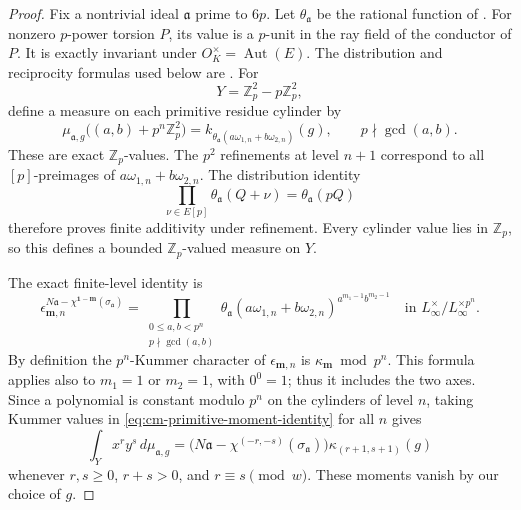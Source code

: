 \begin{proof}
Fix a nontrivial ideal \(\mathfrak a\) prime to \(6p\).
Let \(\theta_{\mathfrak a}\) be the rational function of
\cite[Definition 2.1, p.~7]{IshiiSoule}.
For nonzero \(p\)-power torsion \(P\), its value is a \(p\)-unit
in the ray field of the conductor of \(P\).
It is exactly invariant under \(O_K^\times=\operatorname{Aut}(E)\).
The distribution and reciprocity formulas used below are
\cite[Propositions 2.1--2.2, p.~7]{IshiiSoule}.
For
\[
             Y=\mathbb Z_p^2-p\mathbb Z_p^2,
\]
define a measure on each primitive residue cylinder by
\begin{equation}\label{eq:cm-cylinder-kummer}
 \mu_{\mathfrak a,g}\bigl((a,b)+p^n\mathbb Z_p^2\bigr)
   =k_{\theta_{\mathfrak a}(a\omega_{1,n}+b\omega_{2,n})}(g),
 \qquad p\nmid\gcd(a,b).
\end{equation}
These are exact \(\mathbb Z_p\)-values.
The \(p^2\) refinements at level \(n+1\) correspond to all
\([p]\)-preimages of \(a\omega_{1,n}+b\omega_{2,n}\).
The distribution identity
\[
  \prod_{\nu\in E[p]}\theta_{\mathfrak a}(Q+\nu)
                       =\theta_{\mathfrak a}(pQ)
\]
therefore proves finite additivity under refinement.
Every cylinder value lies in \(\mathbb Z_p\), so this defines a bounded
\(\mathbb Z_p\)-valued measure on \(Y\).

The exact finite-level identity
\cite[Lemma 3.1, p.~11]{IshiiSoule} is
\begin{equation}\label{eq:cm-primitive-moment-identity}
 \epsilon_{\boldsymbol m,n}^{
       N\mathfrak a-\chi^{\boldsymbol1-\boldsymbol m}
                                      (\sigma_{\mathfrak a})}
 =\prod_{\substack{0\leq a,b<p^n\\p\nmid\gcd(a,b)}}
 \theta_{\mathfrak a}(a\omega_{1,n}+b\omega_{2,n})^{
                            a^{m_1-1}b^{m_2-1}}
 \quad\text{in }L_\infty^\times/L_\infty^{\times p^n}.
\end{equation}
By definition the \(p^n\)-Kummer character of
\(\epsilon_{\boldsymbol m,n}\) is
\(\kappa_{\boldsymbol m}\bmod p^n\).
This formula applies also to \(m_1=1\) or \(m_2=1\), with
\(0^0=1\); thus it includes the two axes.
Since a polynomial is constant modulo \(p^n\) on the cylinders
of level \(n\), taking Kummer values in
\eqref{eq:cm-primitive-moment-identity} for all \(n\) gives
\begin{equation}\label{eq:cm-primitive-moment-value}
 \int_Y x^r y^s\,d\mu_{\mathfrak a,g}
 =\bigl(N\mathfrak a-\chi^{(-r,-s)}
                          (\sigma_{\mathfrak a})\bigr)
                  \kappa_{(r+1,s+1)}(g)
\end{equation}
whenever \(r,s\geq0\), \(r+s>0\), and \(r\equiv s\pmod w\).
These moments vanish by our choice of \(g\).


\end{proof}

